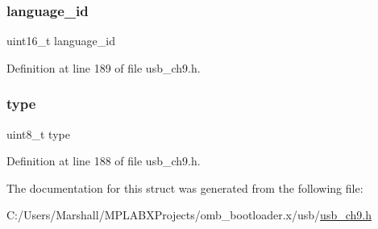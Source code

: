 \subsubsection{\texorpdfstring{language\_id}{language\_id}}
{\footnotesize\ttfamily uint16\+\_\+t language\+\_\+id}



Definition at line 189 of file usb\+\_\+ch9.\+h.

\mbox{\label{struct_d_e_s_c_r_i_p_t_o_r___i_d_a1d127017fb298b889f4ba24752d08b8e}} 
\subsubsection{\texorpdfstring{type}{type}}
{\footnotesize\ttfamily uint8\+\_\+t type}



Definition at line 188 of file usb\+\_\+ch9.\+h.



The documentation for this struct was generated from the following file\+:\begin{DoxyCompactItemize}
\item 
C\+:/\+Users/\+Marshall/\+M\+P\+L\+A\+B\+X\+Projects/omb\+\_\+bootloader.\+x/usb/\mbox{\hyperlink{usb__ch9_8h}{usb\+\_\+ch9.\+h}}\end{DoxyCompactItemize}
